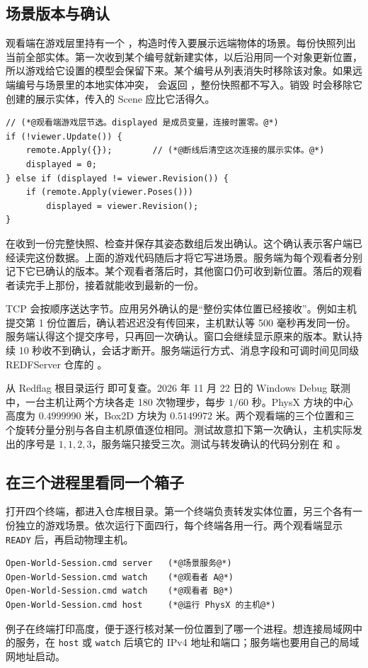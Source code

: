 \clearpage
\subsection{场景版本与确认}

观看端在游戏层里持有一个 ，构造时传入要展示远端物体的场景。每份快照列出当前全部实体。第一次收到某个编号就新建实体，以后沿用同一个对象更新位置，所以游戏给它设置的模型会保留下来。某个编号从列表消失时移除该对象。如果远端编号与场景里的本地实体冲突， 会返回 ，整份快照都不写入。销毁  时会移除它创建的展示实体，传入的 Scene 应比它活得久。

\begin{lstlisting}
// (*@观看端游戏层节选。displayed 是成员变量，连接时置零。@*)
if (!viewer.Update()) {
    remote.Apply({});        // (*@断线后清空这次连接的展示实体。@*)
    displayed = 0;
} else if (displayed != viewer.Revision()) {
    if (remote.Apply(viewer.Poses()))
        displayed = viewer.Revision();
}
\end{lstlisting}

 在收到一份完整快照、检查并保存其姿态数组后发出确认。这个确认表示客户端已经读完这份数据。上面的游戏代码随后才将它写进场景。服务端为每个观看者分别记下它已确认的版本。某个观看者落后时，其他窗口仍可收到新位置。落后的观看者读完手上那份，接着就能收到最新的一份。

TCP 会按顺序送达字节。应用另外确认的是“整份实体位置已经接收”。例如主机提交第 1 份位置后，确认若迟迟没有传回来，主机默认等 500 毫秒再发同一份。服务端认得这个提交序号，只再回一次确认。窗口会继续显示原来的版本。默认持续 10 秒收不到确认，会话才断开。服务端运行方式、消息字段和可调时间见同级 REDFServer 仓库的 。

从 Redflag 根目录运行  即可复查。2026 年 11 月 22 日的 Windows Debug 联测中，一台主机让两个方块各走 180 次物理步，每步 $1/60$ 秒。PhysX 方块的中心高度为 $0.4999990$ 米，Box2D 方块为 $0.5149972$ 米。两个观看端的三个位置和三个旋转分量分别与各自主机原值逐位相同。测试故意扣下第一次确认，主机实际发出的序号是 $1,1,2,3$，服务端只接受三次。测试与转发确认的代码分别在
 和
。

\clearpage
\subsection{在三个进程里看同一个箱子}
打开四个终端，都进入仓库根目录。第一个终端负责转发实体位置，另三个各有一份独立的游戏场景。依次运行下面四行，每个终端各用一行。两个观看端显示 \texttt{READY} 后，再启动物理主机。
\begin{lstlisting}
Open-World-Session.cmd server   (*@场景服务@*)
Open-World-Session.cmd watch    (*@观看者 A@*)
Open-World-Session.cmd watch    (*@观看者 B@*)
Open-World-Session.cmd host     (*@运行 PhysX 的主机@*)
\end{lstlisting}
例子在终端打印高度，便于逐行核对某一份位置到了哪一个进程。想连接局域网中的服务，在 \texttt{host} 或 \texttt{watch} 后填它的 IPv4 地址和端口；服务端也要用自己的局域网地址启动。

